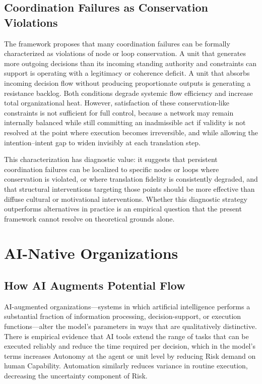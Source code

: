 \documentclass[12pt]{article}
\begin{document}
\subsection{Coordination Failures as Conservation Violations}

The framework proposes that many coordination failures can be formally
characterized as violations of node or loop conservation. A unit that
generates more outgoing decisions than its incoming standing authority and
constraints can support is operating with a legitimacy or coherence deficit.
A unit that absorbs incoming decision flow without producing proportionate
outputs is generating a resistance backlog. Both conditions degrade systemic
flow efficiency and increase total organizational heat. However, satisfaction
of these conservation-like constraints is not sufficient for full control,
because a network may remain internally balanced while still committing an
inadmissible act if validity is not resolved at the point where execution
becomes irreversible, and while allowing the intention--intent gap to widen
invisibly at each translation step.

This characterization has diagnostic value: it suggests that persistent
coordination failures can be localized to specific nodes or loops where
conservation is violated, or where translation fidelity is consistently
degraded, and that structural interventions targeting those points should be
more effective than diffuse cultural or motivational interventions.
Whether this diagnostic strategy outperforms alternatives in practice is an
empirical question that the present framework cannot resolve on theoretical
grounds alone.

\section{AI-Native Organizations}
\label{sec:ai}

\subsection{How AI Augments Potential Flow}

AI-augmented organizations---systems in which artificial intelligence performs
a substantial fraction of information processing, decision-support, or
execution functions---alter the model's parameters in ways that are
qualitatively distinctive. There is empirical evidence that AI tools extend
the range of tasks that can be executed reliably \citep{agrawal2018prediction}
and reduce the time required per decision, which in the model's terms
increases Autonomy at the agent or unit level by reducing Risk demand
on human Capability. Automation similarly reduces variance in routine
execution, decreasing the uncertainty component of Risk.
\end{document}
